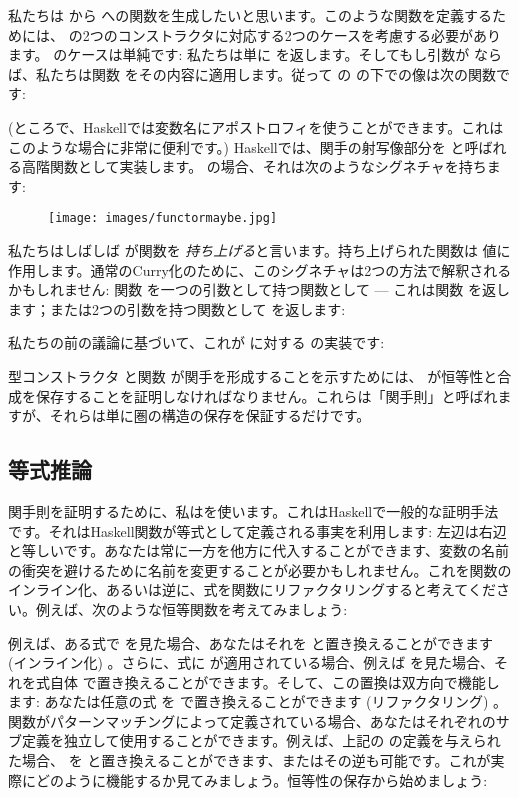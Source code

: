 私たちは  から  への関数を生成したいと思います。このような関数を定義するためには、 の2つのコンストラクタに対応する2つのケースを考慮する必要があります。 のケースは単純です: 私たちは単に  を返します。そしてもし引数が  ならば、私たちは関数  をその内容に適用します。従って  の  の下での像は次の関数です: 

 (ところで、Haskellでは変数名にアポストロフィを使うことができます。これはこのような場合に非常に便利です。) Haskellでは、関手の射写像部分を  と呼ばれる高階関数として実装します。 の場合、それは次のようなシグネチャを持ちます: 


\begin{figure}[H]
  \centering
  \texttt{[image: images/functormaybe.jpg]}
\end{figure}

\noindent
私たちはしばしば  が関数を \emph{持ち上げる}と言います。持ち上げられた関数は  値に作用します。通常のCurry化のために、このシグネチャは2つの方法で解釈されるかもしれません: 関数  を一つの引数として持つ関数として --- これは関数  を返します；または2つの引数を持つ関数として  を返します: 

私たちの前の議論に基づいて、これが  に対する  の実装です: 

型コンストラクタ  と関数  が関手を形成することを示すためには、 が恒等性と合成を保存することを証明しなければなりません。これらは「関手則」と呼ばれますが、それらは単に圏の構造の保存を保証するだけです。

\subsection{等式推論}

関手則を証明するために、私はを使います。これはHaskellで一般的な証明手法です。それはHaskell関数が等式として定義される事実を利用します: 左辺は右辺と等しいです。あなたは常に一方を他方に代入することができます、変数の名前の衝突を避けるために名前を変更することが必要かもしれません。これを関数のインライン化、あるいは逆に、式を関数にリファクタリングすると考えてください。例えば、次のような恒等関数を考えてみましょう: 

例えば、ある式で  を見た場合、あなたはそれを  と置き換えることができます (インライン化) 。さらに、式に  が適用されている場合、例えば  を見た場合、それを式自体  で置き換えることができます。そして、この置換は双方向で機能します: あなたは任意の式  を  で置き換えることができます (リファクタリング) 。関数がパターンマッチングによって定義されている場合、あなたはそれぞれのサブ定義を独立して使用することができます。例えば、上記の  の定義を与えられた場合、 を  と置き換えることができます、またはその逆も可能です。これが実際にどのように機能するか見てみましょう。恒等性の保存から始めましょう: 

